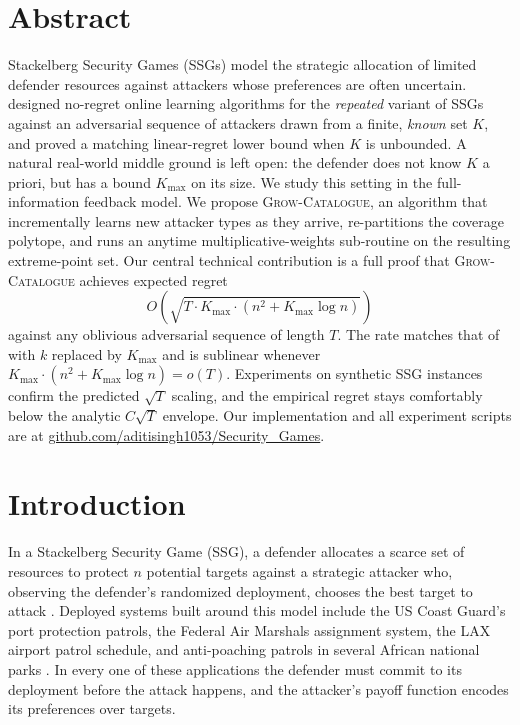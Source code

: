 \documentclass[letterpaper,9pt,twocolumn]{extarticle}
\newcommand{\Kmax}{K_{\max}}
\theoremstyle{plain}
\theoremstyle{definition}
\theoremstyle{remark}
\begin{document}
\section{Abstract}
\label{sec:Abstract}
Stackelberg Security Games (SSGs) model the strategic allocation of limited
defender resources against attackers whose preferences are often uncertain.
\citet{balcan2015} designed no-regret online learning algorithms for the
\emph{repeated} variant of SSGs against an adversarial sequence of attackers
drawn from a finite, \emph{known} set $K$, and proved a matching linear-regret
lower bound when $K$ is unbounded. A natural real-world middle ground is
left open: the defender does not know $K$ a priori, but has a bound $\Kmax$
on its size. We study this setting in the full-information feedback model.
We propose \textsc{Grow-Catalogue}, an algorithm that incrementally learns
new attacker types as they arrive, re-partitions the coverage polytope, and
runs an anytime multiplicative-weights sub-routine on the resulting
extreme-point set. Our central technical contribution is a full proof that
\textsc{Grow-Catalogue} achieves expected regret
\[
O\!\left(\sqrt{T\cdot\Kmax\cdot(n^2+\Kmax\log n)}\right)
\]
against any oblivious adversarial sequence of length $T$. The rate matches
that of \citet{balcan2015} with $k$ replaced by $\Kmax$ and is sublinear
whenever $\Kmax\cdot(n^2+\Kmax\log n)=o(T)$. Experiments on synthetic SSG
instances confirm the predicted $\sqrt{T}$ scaling, and the empirical regret
stays comfortably below the analytic $C\sqrt{T}$ envelope. Our implementation and all experiment scripts are at
\textcolor{blue}{\href{https://github.com/aditisingh1053/Security_Games}{github.com/aditisingh1053/Security\_Games}}.

\section{Introduction}
\label{sec:intro}

In a Stackelberg Security Game (SSG), a defender allocates a scarce set of
resources to protect $n$ potential targets against a strategic attacker
who, observing the defender's randomized deployment, chooses the best
target to attack \citep{tambe2012}. Deployed systems built around this model
include the US Coast Guard's port protection patrols, the Federal Air
Marshals assignment system, the LAX airport patrol schedule, and
anti-poaching patrols in several African national parks
\citep{tambe2012,yang2014}. In every one of these applications the
defender must commit to its deployment before the attack happens, and the
attacker's payoff function encodes its preferences over targets.
\end{document}
